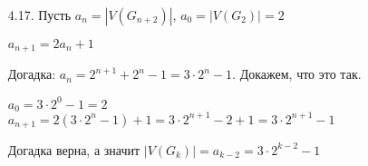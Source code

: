 \documentclass[10pt]{article}
\begin{document}
\begin{enumerate}
\item[4.17.] Пусть $a_n = |V(G_{n+2})|$, $a_0 = |V(G_2)| = 2$

$a_{n+1} = 2a_n +1$

Догадка: $a_n = 2^{n+1} + 2^n - 1 = 3\cdot 2 ^n - 1$. Докажем, что это так.

$a_0 = 3 \cdot 2^0 - 1 = 2$\\
$a_{n+1} = 2(3\cdot 2^n - 1) + 1 = 3 \cdot 2^{n+1} -2 +1 = 3 \cdot 2^{n+1} - 1$

Догадка верна, а значит $|V(G_k)| = a_{k-2} = 3 \cdot 2^{k-2}-1$
\end{enumerate}
\end{document}
